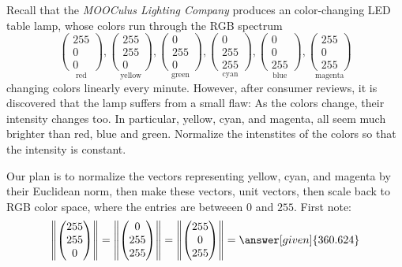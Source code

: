 \documentclass{ximera}
\begin{document}
\begin{example}
  Recall that the \textit{MOOCulus Lighting Company} produces an color-changing LED table lamp, whose colors run through the RGB spectrum
    \[
    \underset{\text{red}}{\begin{pmatrix}255\\0\\0\end{pmatrix}},
    \underset{\text{yellow}}{\begin{pmatrix}255\\255\\0\end{pmatrix}},
    \underset{\text{green}}{\begin{pmatrix}0\\255\\0\end{pmatrix}},
    \underset{\text{cyan}}{\begin{pmatrix}0\\255\\255\end{pmatrix}},
    \underset{\text{blue}}{\begin{pmatrix}0\\0\\255\end{pmatrix}},
    \underset{\text{magenta}}{\begin{pmatrix}255\\0\\255\end{pmatrix}}
    \]
    changing colors linearly every minute. However, after consumer
    reviews, it is discovered that the lamp suffers from a small flaw:
    As the colors change, their intensity changes too. In particular,
    yellow, cyan, and magenta, all seem much brighter than red, blue
    and green. Normalize the intenstites of the colors so that the
    intensity is constant.
  \begin{explanation}
   Our plan is to normalize the vectors representing yellow, cyan, and
   magenta by their Euclidean norm, then make these vectors, unit
   vectors, then scale back to RGB color space, where the entries are
   betweeen $0$ and $255$. First note:
   \[
   \left\|\begin{pmatrix}255\\255\\0\end{pmatrix}\right\| =  \left\|\begin{pmatrix}0\\255\\255\end{pmatrix}\right\| =  \left\|\begin{pmatrix}255\\0\\255\end{pmatrix}\right\| = \answer[given]{360.624}
\]
\end{explanation}
\end{example}
\end{document}
